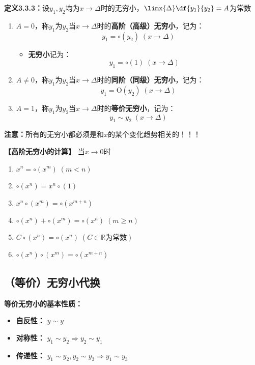 {\bf 定义3.3.3：}设$y_1,y_2$均为$x\to\Delta$时的无穷小，$\limx{\Delta}\df{y_1}{y_2}=A$为常数
\begin{enumerate}[(1)]
  \setlength{\itemindent}{1cm}
  \item $A=0$，称$y_1$为$y_2$当$x\to\Delta$时的{\bf 高阶（高级）无穷小}，记为：
  $$y_1=\circ( y_2)\;(x\to\Delta)$$
  \begin{itemize}
    \item {\bf 无穷小}记为：
    $$y_1=\circ(1)\;(x\to\Delta)$$
  \end{itemize}
  \item $A\ne 0$，称$y_1$为$y_2$当$x\to\Delta$时的{\bf 同阶（同级）无穷小}，记为：
  $$y_1=\mathrm{O}( y_2)\;(x\to\Delta)$$
  \item $A=1$，称$y_1$为$y_2$当$x\to\Delta$时的{\bf 等价无穷小}，记为：
  $$y_1\sim y_2\;(x\to\Delta)$$
\end{enumerate}

{\bf 注意：}所有的无穷小都必须是和$x$的某个变化趋势相关的！！！

\begin{shaded}
	{\bf 【高阶无穷小的计算】}
	当$x\to 0$时
	\begin{enumerate}[(1)]
  	  \setlength{\itemindent}{1cm}
	  \item $x^n=\circ(x^m)\;(m<n)$ 
	  \item $\circ(x^n)=x^n\circ(1)$ 
	  \item $x^n\circ(x^m)=\circ(x^{m+n})$ 
	  \item $\circ(x^n)+\circ(x^m)=\circ(x^n)\;(m\geq n)$ 
	  \item $C\circ(x^n)=\circ(x^n)\;(C\in\mathbb{R}\mbox{为常数})$ 
	  \item $\circ(x^n)\circ(x^m)=\circ(x^{m+n})$
	\end{enumerate}
\end{shaded}

\subsection{（等价）无穷小代换}

{\bf 等价无穷小的基本性质：}
\begin{itemize}
  \setlength{\itemindent}{1cm}
  \item {\bf 自反性：} $y\sim y$ 
  \item {\bf 对称性：} $y_1\sim y_2\Rightarrow y_2\sim y_1$ 
  \item {\bf 传递性：} $y_1\sim y_2,y_2\sim y_3\Rightarrow y_1\sim y_3$ 
\end{itemize}

